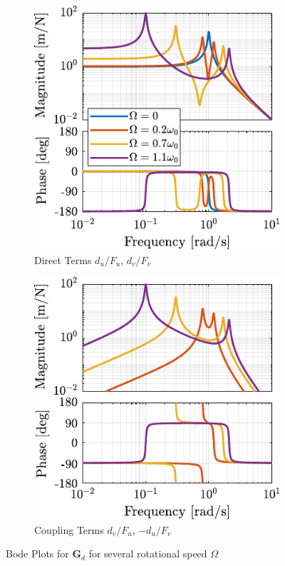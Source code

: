 \documentclass{ISMA_USD2020}
\begin{document}
\begin{figure}[htbp]
\begin{subfigure}[c]{0.45\linewidth}
\includegraphics[width=\linewidth]{figs/plant_compare_rotating_speed_direct.pdf}
\caption{\label{fig:plant_compare_rotating_speed_direct} Direct Terms \(d_u/F_u\), \(d_v/F_v\)}
\end{subfigure}
\begin{subfigure}[c]{0.45\linewidth}
\includegraphics[width=\linewidth]{figs/plant_compare_rotating_speed_coupling.pdf}
\caption{\label{fig:plant_compare_rotating_speed_coupling} Coupling Terms \(d_v/F_u\), \(-d_u/F_v\)}
\end{subfigure}
\caption{\label{fig:plant_compare_rotating_speed}Bode Plots for \(\bm{G}_d\) for several rotational speed \(\Omega\)}
\centering
\end{figure}
\end{document}
